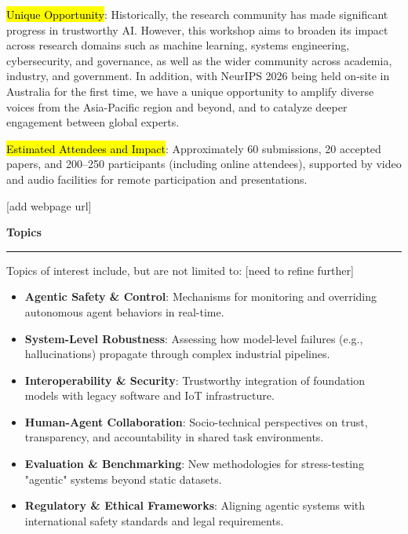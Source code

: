 \documentclass{article}
\newcommand{\sectiontitle}[1]{\noindent\textbf{\textcolor{neuripsblue}{#1}}\vspace{0.1cm}\hrule\vspace{0.2cm}}
\begin{document}
\hl{Unique Opportunity}: Historically, the research community has made significant progress in trustworthy AI. However, this workshop aims to broaden its impact across research domains such as machine learning, systems engineering, cybersecurity, and governance, as well as the wider community across academia, industry, and government. In addition, with NeurIPS 2026 being held on-site in Australia for the first time, we have a unique opportunity to amplify diverse voices from the Asia-Pacific region and beyond, and to catalyze deeper engagement between global experts.

\hl{Estimated Attendees and Impact}: Approximately 60 submissions, 20 accepted papers, and 200–250 participants (including online attendees), supported by video and audio facilities for remote participation and presentations.

[add webpage url]

\sectiontitle{Topics}
Topics of interest include, but are not limited to: [need to refine further]
\begin{itemize}[leftmargin=10pt,noitemsep,topsep=0pt]
\item \textbf{Agentic Safety \& Control}: Mechanisms for monitoring and overriding autonomous agent behaviors in real-time.
\item \textbf{System-Level Robustness}: Assessing how model-level failures (e.g., hallucinations) propagate through complex industrial pipelines.
\item \textbf{Interoperability \& Security}: Trustworthy integration of foundation models with legacy software and IoT infrastructure.
\item \textbf{Human-Agent Collaboration}: Socio-technical perspectives on trust, transparency, and accountability in shared task environments.
\item \textbf{Evaluation \& Benchmarking}: New methodologies for stress-testing "agentic" systems beyond static datasets.
\item \textbf{Regulatory \& Ethical Frameworks}: Aligning agentic systems with international safety standards and legal requirements.
\end{itemize}



\end{document}
